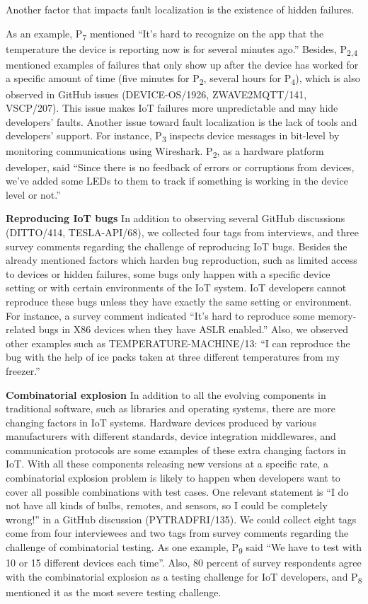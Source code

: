 Another factor that impacts fault localization is the existence of hidden failures. 

As an example, P\textsubscript{7} mentioned \enquote{It's hard to recognize on the app that the temperature the device is reporting now is for several minutes ago.} Besides, P\textsubscript{2,4} mentioned examples of failures that only show up after the device has worked for a specific amount of time (five minutes for P\textsubscript{2}, several hours for P\textsubscript{4}), which is also observed in GitHub issues (DEVICE-OS/1926, ZWAVE2MQTT/141, VSCP/207). This issue makes IoT failures more unpredictable and may hide developers' faults. Another issue toward fault localization is the lack of tools and developers' support. For instance, P\textsubscript{3} inspects device messages in bit-level by monitoring communications using Wireshark. P\textsubscript{2}, as a hardware platform developer, said \enquote{Since there is no feedback of errors or corruptions from devices, we've added some LEDs to them to track if something is working in the device level or not.}


\textbf{Reproducing IoT bugs}
In addition to observing several GitHub discussions (DITTO/414, TESLA-API/68), we collected four tags from interviews, and three survey comments regarding the challenge of reproducing IoT bugs. Besides the already mentioned factors which harden bug reproduction, such as limited access to devices or hidden failures, some bugs only happen with a specific device setting or with certain environments of the IoT system. IoT developers cannot reproduce these bugs unless they have exactly the same setting or environment. For instance, a survey comment indicated \enquote{It's hard to reproduce some memory-related bugs in X86 devices when they have ASLR enabled.}
Also, we observed other examples such as TEMPERATURE-MACHINE/13: \enquote{I can reproduce the bug with the help of ice packs taken at three different temperatures from my freezer.}

\textbf{Combinatorial explosion}
In addition to all the evolving components in traditional software, such as libraries and operating systems, there are more changing factors in IoT systems. Hardware devices produced by various manufacturers with different standards, device integration middlewares, and communication protocols are some examples of these extra changing factors in IoT. With all these components releasing new versions at a specific rate, a combinatorial explosion problem is likely to happen when developers want to cover all possible combinations with test cases.
One relevant statement is \enquote{I do not have all kinds of bulbs, remotes, and sensors, so I could be completely wrong!} in a GitHub discussion (PYTRADFRI/135). We could collect eight tags come from four interviewees and two tags from survey comments regarding the challenge of combinatorial testing. As one example, P\textsubscript{9} said \enquote{We have to test with 10 or 15 different devices each time}. Also, 80 percent of survey respondents agree with the combinatorial explosion as a testing challenge for IoT developers, and P\textsubscript{8} mentioned it as the most severe testing challenge. 

